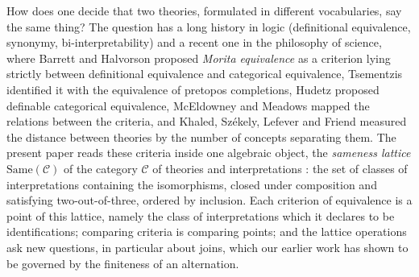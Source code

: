 \documentclass[11pt]{amsart}
\theoremstyle{definition}
\newcommand{\Same}{\mathrm{Same}}
\newcommand{\cC}{\mathcal C}
\begin{document}
How does one decide that two theories, formulated in different
vocabularies, say the same thing? The question has a long history in
logic (definitional equivalence, synonymy, bi-interpretability) and a
recent one in the philosophy of science, where Barrett and Halvorson
\cite{BH16} proposed \emph{Morita equivalence} as a criterion lying
strictly between definitional equivalence and categorical equivalence,
Tsementzis \cite{Tsem17} identified it with the equivalence of pretopos
completions, Hudetz \cite{Hudetz19} proposed definable categorical
equivalence, McEldowney \cite{McEl20} and Meadows \cite{Meadows24}
mapped the relations between the criteria, and Khaled, Sz\'ekely,
Lefever and Friend \cite{KSLF20} measured the distance between theories
by the number of concepts separating them. The present paper reads
these criteria inside one algebraic object, the \emph{sameness lattice}
$\Same(\cC)$ of the category $\cC$ of theories and interpretations
\cite{Same}: the set of classes of interpretations containing the
isomorphisms, closed under composition and satisfying two-out-of-three,
ordered by inclusion. Each criterion of equivalence is a point of this
lattice, namely the class of interpretations which it declares to be
identifications; comparing criteria is comparing points; and the
lattice operations ask new questions, in particular about joins, which
our earlier work \cite{Fijoin,Cutpoints} has shown to be governed by
the finiteness of an alternation.
\end{document}

